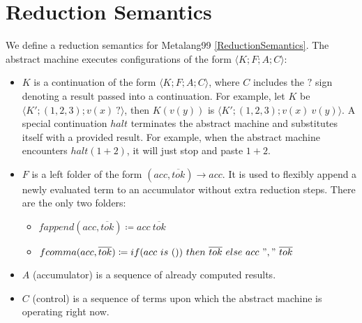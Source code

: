 \documentclass[12pt]{article}
\theoremstyle{break}
\begin{document}
\section{Reduction Semantics}

We define a reduction semantics for Metalang99 \ref{ReductionSemantics}. The abstract
machine executes configurations of the form $\langle K; F; A; C \rangle$:

\begin{itemize}
    \item $K$ is a continuation of the form $\langle K; F; A; C \rangle$, where
    $C$ includes the $?$ sign denoting a result passed into a continuation.
    For example, let $K$ be $\langle K'; (1, 2, 3); v(x) \ ? \rangle$,
    then $K(v(y))$ is $\langle K'; (1, 2, 3); v(x) \ v(y) \rangle$. A special
    continuation $halt$ terminates the abstract machine and substitutes itself
    with a provided result. For example, when the abstract machine encounters
    $halt(1 + 2)$, it will just stop and paste $1 + 2$.

    \item $F$ is a left folder of the form $(acc, \overline{tok}) \to acc$. It is used
    to flexibly append a newly evaluated term to an accumulator without extra reduction
    steps. There are the only two folders:
    \begin{itemize}
        \item $fappend(acc, \overline{tok}) \coloneqq acc \ \overline{tok}$
        \item $fcomma(acc, \overline{tok}) \coloneqq if (acc \ is \ ()) \ then \ \overline{tok} \ else \ acc \ "," \ \overline{tok}$
    \end{itemize}

    \item $A$ (accumulator) is a sequence of already computed results.

    \item $C$ (control) is a sequence of terms upon which the abstract
    machine is operating right now.
\end{itemize}
\end{document}
